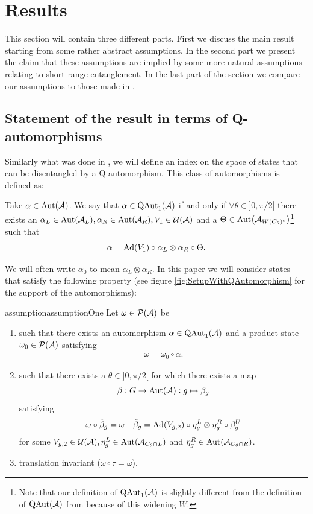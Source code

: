 \documentclass[12pt,a4paper,twoside]{article}
\numberwithin{equation}{section}
\begin{document}
\section{Results}
This section will contain three different parts. First we discuss the main result starting from some rather abstract assumptions. In the second part we present the claim that these assumptions are implied by some more natural assumptions relating to short range entanglement. In the last part of the section we compare our assumptions to those made in \cite{ogata2021h3gmathbb}.
\subsection{Statement of the result in terms of Q-automorphisms}\label{sec:Results_2}

Similarly what was done in \cite{ogata2021h3gmathbb}, we will define an index on the space of states that can be disentangled by a Q-automorphism. This class of automorphisms is defined as:
\begin{definition}
	Take $\alpha\in\Aut{\AA}$. We say that $\alpha\in\QAut{\AA}$ if and only if $\forall\theta\in]0,\pi/2[$ there exists an $\alpha_L\in\Aut{\AA_L},\alpha_R\in\Aut{\AA_R},V_1\in\UU(\AA)$ and a $\Theta\in\Aut{\AA_{W(C_\theta)^c}}$\footnote{Note that our definition of $\QAut{\AA}$ is slightly different from the definition of $\textrm{QAut}(\AA)$ from \cite{ogata2021h3gmathbb} because of this widening $W$.} such that
	\begin{equation}
		\alpha=\Ad{V_1}\circ\alpha_L\otimes\alpha_R\circ\Theta.
	\end{equation}
\end{definition}
We will often write $\alpha_0$ to mean $\alpha_L\otimes\alpha_R$. In this paper we will consider states that satisfy the following property (see figure \ref{fig:SetupWithQAutomorphism} for the support of the automorphisms):
\begin{restatable}{assumption}{assumptionOne}\label{assumption}
	Let $\omega\in\PP(\AA)$ be
	\begin{enumerate}
		\item such that there exists an automorphism $\alpha\in\QAut{\AA}$ and a product state $\omega_0\in\PP(\AA)$ satisfying
		\begin{align}
			\omega=\omega_0\circ\alpha.
		\end{align}
		\item such that there exists a $\theta\in]0,\pi/2[$ for which there exists a map
		\begin{equation}
			\tilde\beta:G\rightarrow\Aut{\AA}:g\mapsto\tilde\beta_g
		\end{equation}
		satisfying
		\begin{align}
			\omega\circ\tilde\beta_g&=\omega&\tilde\beta_g=\Ad{V_{g,2}}\circ\eta^L_g\otimes\eta^R_g\circ\beta^U_g
		\end{align}
		for some $V_{g,2}\in\UU(\AA),\eta^L_g\in\Aut{\AA_{C_\theta\cap L}}$ and $\eta^R_g\in\Aut{\AA_{C_\theta\cap R}}$.
		\item translation invariant ($\omega\circ\tau=\omega$).
	\end{enumerate}
\end{restatable}
\end{document}
